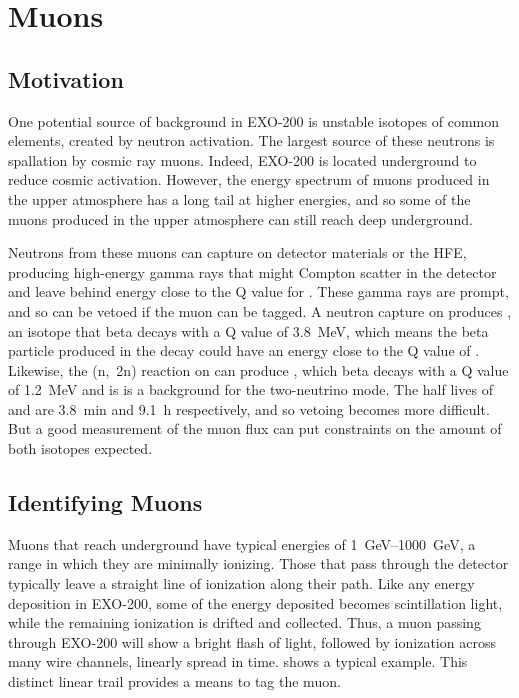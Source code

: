 \documentclass[herrin-thesis.tex]{subfiles}
\begin{document}
\chapter{Muons}
\label{ch:muons}

\section{Motivation}
\label{sec:muon:motivation}
One potential source of background in EXO-200 is unstable isotopes of common elements, created by neutron activation. The largest source of these neutrons is spallation by cosmic ray muons. Indeed, EXO-200 is located underground to reduce cosmic activation. However, the energy spectrum of muons produced in the upper atmosphere has a long tail at higher energies, and so some of the muons produced in the upper atmosphere can still reach deep underground.

Neutrons from these muons can capture on detector materials or the HFE, producing high-energy gamma rays that might Compton scatter in the detector and leave behind energy close to the Q value for . These gamma rays are prompt, and so can be vetoed if the muon can be tagged. A neutron capture on  produces , an isotope that beta decays with a Q value of \SI{3.8}{\MeV}, which means the beta particle produced in the decay could have an energy close to the Q value of . Likewise, the (n,~2n) reaction on  can produce , which beta decays with a Q value of \SI{1.2}{\MeV} and is is a background for the two-neutrino mode. The half lives of  and  are \SI{3.8}{\minute} and \SI{9.1}{\hour} respectively, and so vetoing becomes more difficult. But a good measurement of the muon flux can put constraints on the amount of both isotopes expected.

\section{Identifying Muons}
\label{sec:muon:id}
Muons that reach underground have typical energies of \SIrange{1}{1000}{\GeV}, a range in which they are minimally ionizing. Those that pass through the detector typically leave a straight line of ionization along their path. Like any energy deposition in EXO-200, some of the energy deposited becomes scintillation light, while the remaining ionization is drifted and collected. Thus, a muon passing through EXO-200 will show a bright flash of light, followed by ionization across many wire channels, linearly spread in time.  shows a typical example. This distinct linear trail provides a means to tag the muon.
\end{document}

